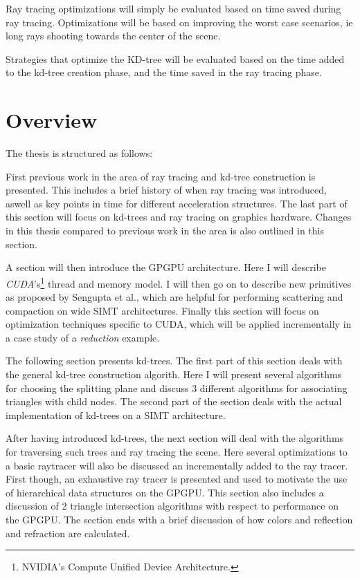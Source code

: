 
Ray tracing optimizations will simply be evaluated based on time saved
during ray tracing. Optimizations will be based on improving the
worst case scenarios, ie long rays shooting towards the center of
the scene.

Strategies that optimize the KD-tree will be evaluated based on the
time added to the kd-tree creation phase, and the time saved in the
ray tracing phase.

\section{Overview}

The thesis is structured as follows:


First previous work in the area of ray tracing and kd-tree
construction is presented. This includes a brief history of when ray
tracing was introduced, aswell as key points in time for different
acceleration structures. The last part of this section will focus on
kd-trees and ray tracing on graphics hardware. Changes in this thesis
compared to previous work in the area is also outlined in this
section.


A section will then introduce the GPGPU architecture. Here I will
describe \textit{CUDA}'s\footnote{NVIDIA's Compute Unified Device
  Architecture.} thread and memory model. I will then go on to
describe new primitives as proposed by Sengupta et
al., which are helpful for performing
scattering and compaction on wide SIMT architectures. Finally this
section will focus on optimization techniques specific to CUDA, which
will be applied incrementally in a case study of a \textit{reduction}
example.


The following section presents kd-trees. The first part of this
section deals with the general kd-tree construction algorith. Here I
will present several algorithms for choosing the splitting plane and
discuss 3 different algorithms for associating triangles with child
nodes. The second part of the section deals with the actual
implementation of kd-trees on a SIMT architecture.


After having introduced kd-trees, the next section will deal with the
algorithms for traversing such trees and ray tracing the scene. Here
several optimizations to a basic raytracer will also be discussed an
incrementally added to the ray tracer. First though, an exhaustive ray
tracer is presented and used to motivate the use of hierarchical data
structures on the GPGPU. This section also includes a discussion of 2
triangle intersection algorithms with respect to performance on the
GPGPU. The section ends with a brief discussion of how colors and
reflection and refraction are calculated.




